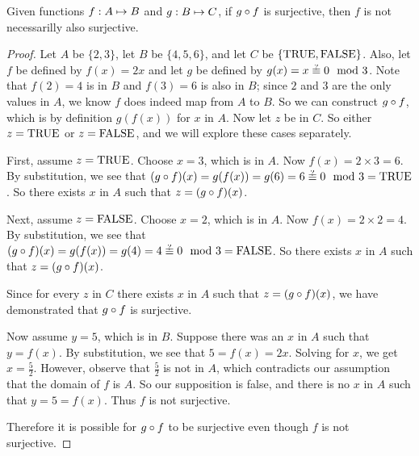 \documentclass[main.tex]{subfiles}
\begin{document}
\begin{thm}
	Given functions \({f}: {A} \mapsto{} {B}\) and \({g}: {B} \mapsto{} {C}\), if
	\({g} \circ{} {f}\) is surjective, then \(f\) is not necessarilly also
	surjective.
\end{thm}
\begin{proof}
	Let \(A\) be \(\{2,3\}\), let \(B\) be \(\{4,5,6\}\), and let \(C\) be
	\(\{\mbox{TRUE},\mbox{FALSE}\}\). Also, let \(f\) be defined by \(f(x) = 2x\) and let \(g\)
	be defined by \(g(x) = \maybeeqmod{x}{0}{3}\). Note that \(f(2) = 4\) is
	in \(B\) and \(f(3) = 6\) is also in \(B\); since \(2\) and \(3\) are
	the only values in \(A\), we know \(f\) does indeed map from \(A\) to
	\(B\). So we can construct \({g} \circ{} {f}\), which is by definition
	\(g(f(x))\) for \(x\) in \(A\). Now let \(z\) be in \(C\). So either
	\(z = \mbox{TRUE}\) or \(z = \mbox{FALSE}\), and we will explore these cases
	separately.

	First, assume \(z = \mbox{TRUE}\). Choose \(x = 3\), which is in \(A\). Now
	\(f(x) = 2 \times 3 = 6\). By substitution, we see that
	\(\composeapply{g}{f}{x} = g(f(x)) = g(6) = \maybeeqmod{6}{0}{3} = \true\).
	So there exists \(x\) in \(A\) such that \(z = ({g} \circ{} {f})({x})\).

	Next, assume \(z = \mbox{FALSE}\). Choose \(x = 2\), which is in \(A\). Now
	\(f(x) = 2 \times 2 = 4\). By substitution, we see that
	\(\composeapply{g}{f}{x} = g(f(x)) = g(4) = \maybeeqmod{4}{0}{3} = \false\).
	So there exists \(x\) in \(A\) such that \(z = ({g} \circ{} {f})({x})\).

	Since for every \(z\) in \(C\) there exists \(x\) in \(A\) such that
	\(z = ({g} \circ{} {f})({x})\), we have demonstrated that
	\({g} \circ{} {f}\) is surjective.

	Now assume \(y = 5\), which is in \(B\). Suppose there was an \(x\) in
	\(A\) such that \(y = f(x)\). By substitution, we see that
	\(5 = f(x) = 2x\). Solving for \(x\), we get \(x = \frac{5}{2}\).
	However, observe that \(\frac{5}{2}\) is not in \(A\), which contradicts
	our assumption that the domain of \(f\) is \(A\). So our supposition is
	false, and there is no \(x\) in \(A\) such that \(y = 5 = f(x)\). Thus
	\(f\) is not surjective.

	Therefore it is possible for \({g} \circ{} {f}\) to be surjective even
	though \(f\) is not surjective.
\end{proof}
\end{document}
